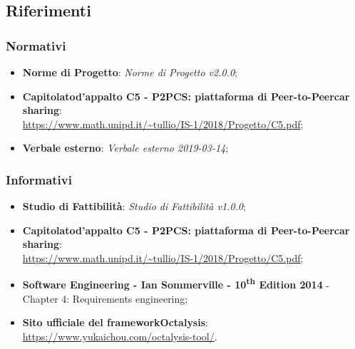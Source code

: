 \subsection{Riferimenti}
\subsubsection{Normativi}
\begin{itemize}
	\item \textbf{Norme di Progetto}: \textit{Norme di Progetto v2.0.0};

	\item \textbf{Capitolato\glosp d'appalto C5 - P2PCS: piattaforma di Peer-to-Peer\glosp car sharing}: \\ \url{ https://www.math.unipd.it/~tullio/IS-1/2018/Progetto/C5.pdf};
	\item \textbf{Verbale esterno}: \textit{Verbale esterno 2019-03-14};

\end{itemize}
\subsubsection{Informativi}
\begin{itemize}
	\item \textbf{Studio di Fattibilità}: \textit{Studio di Fattibilità v1.0.0};
	\item \textbf{Capitolato\glosp d'appalto C5 - P2PCS: piattaforma di Peer-to-Peer\glosp car sharing}: \\ \url{ https://www.math.unipd.it/~tullio/IS-1/2018/Progetto/C5.pdf};
	\item \textbf{Software Engineering - Ian Sommerville - 10\textsuperscript{th} Edition 2014}
	\subitem - Chapter 4: Requirements engineering;
	\item \textbf{Sito ufficiale del framework\glosp Octalysis\glo}: \\ \textsf{\url{https://www.yukaichou.com/octalysis-tool/}}. 

\end{itemize}